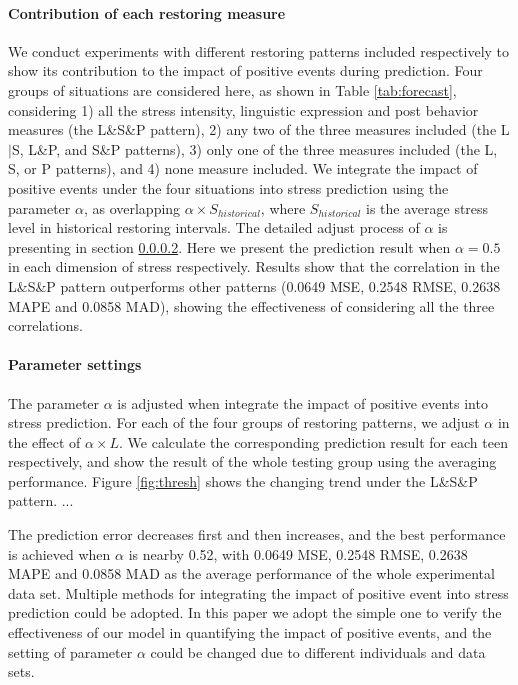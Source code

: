 \paragraph{Contribution of each restoring measure}
We conduct experiments with different restoring patterns included respectively to show
its contribution to the impact of positive events during prediction.
Four groups of situations are considered here, as shown in Table \ref{tab:forecast},
considering
1) all the stress intensity, linguistic expression and post behavior measures (the L\&S\&P pattern),
2) any two of the three measures included (the L$|$S, L\&P, and S\&P patterns),
3) only one of the three measures included (the L, S, or P patterns),
and 4) none measure included.
We integrate the impact of positive events under the four situations into stress prediction
using the parameter $\alpha$,
as overlapping $\alpha \times S_{historical}$,
where $S_{historical}$ is the average stress level in historical restoring intervals.
The detailed adjust process of $\alpha$  is presenting in section \ref{sec:parameter}.
Here we present the prediction result when $\alpha = 0.5$ in each dimension of stress respectively.
Results show that the correlation in the L\&S\&P pattern outperforms other patterns
(0.0649 MSE, 0.2548 RMSE, 0.2638 MAPE and 0.0858 MAD),
showing the effectiveness of considering all the three correlations.

\paragraph{Parameter settings}
\label{sec:parameter}
The parameter $\alpha$ is adjusted when integrate the impact of positive events into stress prediction.
For each of the four groups of restoring patterns,
we adjust $\alpha$ in the effect of $\alpha \times L$.
We calculate the corresponding prediction result for each teen respectively,
and show the result of the whole testing group using the averaging performance.
Figure \ref{fig:thresh} shows the changing trend under the L\&S\&P pattern.
...


The prediction error decreases first and then increases,
and the best performance is achieved when $\alpha$ is nearby 0.52,
with 0.0649 MSE, 0.2548 RMSE, 0.2638 MAPE and 0.0858 MAD as the average performance of the whole experimental data set.
Multiple methods for integrating the impact of positive event into stress prediction could be adopted.
In this paper we adopt the simple one to verify the effectiveness of our model in quantifying the impact of positive events,
and the setting of parameter $\alpha$ could be changed due to different individuals and data sets.
